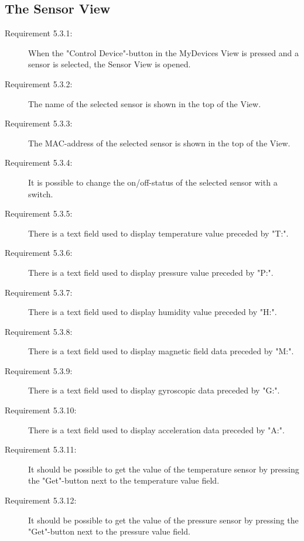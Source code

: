 \documentclass[a4paper]{article}
\begin{document}
\subsection{The Sensor View}

\begin{description}
\item[Requirement 5.3.1:] When the "Control Device"-button in the MyDevices View is pressed and a sensor is selected, the Sensor View is opened. 

\item[Requirement 5.3.2:] The name of the selected sensor is shown in the top of the View.

\item[Requirement 5.3.3:] The MAC-address of the selected sensor is shown in the top of the View.

\item[Requirement 5.3.4:] It is possible to change the on/off-status of the selected sensor with a switch.

\item[Requirement 5.3.5:] There is a text field used to display temperature value preceded by "T:".

\item[Requirement 5.3.6:] There is a text field used to display pressure value preceded by "P:".

\item[Requirement 5.3.7:] There is a text field used to display humidity value preceded by "H:".

\item[Requirement 5.3.8:] There is a text field used to display magnetic field data preceded by "M:".

\item[Requirement 5.3.9:] There is a text field used to display gyroscopic data preceded by "G:".

\item[Requirement 5.3.10:] There is a text field used to display acceleration data preceded by "A:".

\item[Requirement 5.3.11:] It should be possible to get the value of the temperature sensor by pressing the "Get"-button next to the temperature value field.

\item[Requirement 5.3.12:] It should be possible to get the value of the pressure sensor by pressing the "Get"-button next to the pressure value field.


\end{description}
\end{document}
